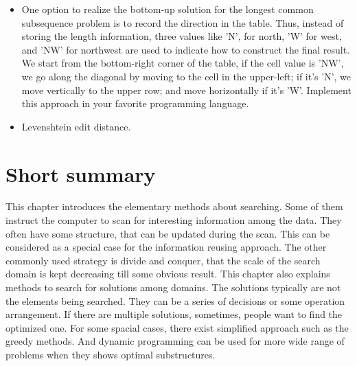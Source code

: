 \documentclass[UTF8]{article}
\begin{document}
\begin{Exercise}
\begin{itemize}
\item One option to realize the bottom-up solution for the longest common subsequence problem
is to record the direction in the table. Thus, instead of storing the length information,
three values like 'N', for north, 'W' for west, and 'NW' for northwest are used to indicate
how to construct the final result. We start from the bottom-right corner of the table, if
the cell value is 'NW', we go along the diagonal by moving to the cell in the upper-left;
if it's 'N', we move vertically to the upper row; and move horizontally if it's 'W'.
Implement this approach in your favorite programming language.
\item Levenshtein edit distance.
\end{itemize}
\end{Exercise}

\section{Short summary}
This chapter introduces the elementary methods about searching. Some of them instruct
the computer to scan for interesting information among the data. They often have
some structure, that can be updated during the scan. This can be considered
as a special case for the information reusing approach. The other commonly used
strategy is divide and conquer, that the scale of the search domain is
kept decreasing till some obvious result. This chapter also explains methods
to search for solutions among domains. The solutions typically are not
the elements being searched. They can be a series of decisions or some
operation arrangement. If there are multiple solutions, sometimes, people want
to find the optimized one. For some spacial cases, there exist simplified
approach such as the greedy methods. And dynamic programming can be used
for more wide range of problems when they shows optimal substructures.
\end{document}
